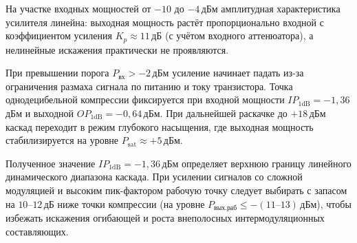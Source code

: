 На участке входных мощностей от $-10$ до $-4$\,дБм амплитудная характеристика усилителя линейна: выходная мощность растёт пропорционально входной с коэффициентом усиления $K_p \approx 11$\,дБ (с учётом входного аттенюатора), а нелинейные искажения практически не проявляются.

При превышении порога $P_{\text{вх}} > -2$\,дБм усиление начинает падать из-за ограничения размаха сигнала по питанию и току транзистора. Точка однодецибельной компрессии фиксируется при входной мощности $IP_{1\text{dB}} = -1{,}36$\,дБм и выходной $OP_{1\text{dB}} = -0{,}64$\,дБм. При дальнейшей раскачке до $+18$\,дБм каскад переходит в режим глубокого насыщения, где выходная мощность стабилизируется на уровне $P_{\text{sat}} \approx +5$\,дБм.

Полученное значение $IP_{1\text{dB}} = -1{,}36$\,дБм определяет верхнюю границу линейного динамического диапазона каскада. При усилении сигналов со сложной модуляцией и высоким пик-фактором рабочую точку следует выбирать с запасом на $10\text{--}12$\,дБ ниже точки компрессии (на уровне $P_{\text{вых.раб}} \le -(11\text{--}13)$\,дБм), чтобы избежать искажения огибающей и роста внеполосных интермодуляционных составляющих.
